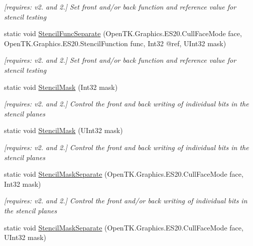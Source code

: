 \begin{DoxyCompactItemize}
\begin{DoxyCompactList}\small\item\em \mbox{[}requires\-: v2. and 2.\mbox{]} Set front and/or back function and reference value for stencil testing \end{DoxyCompactList}\item 
static void \hyperlink{class_open_t_k_1_1_graphics_1_1_e_s20_1_1_g_l_aa697e571e6a7501ef1214d4f4e939ae1}{Stencil\-Func\-Separate} (Open\-T\-K.\-Graphics.\-E\-S20.\-Cull\-Face\-Mode face, Open\-T\-K.\-Graphics.\-E\-S20.\-Stencil\-Function func, Int32 @ref, U\-Int32 mask)
\begin{DoxyCompactList}\small\item\em \mbox{[}requires\-: v2. and 2.\mbox{]} Set front and/or back function and reference value for stencil testing \end{DoxyCompactList}\item 
static void \hyperlink{class_open_t_k_1_1_graphics_1_1_e_s20_1_1_g_l_a33d0ee8613fd2f8cc2da911e2e7d62a7}{Stencil\-Mask} (Int32 mask)
\begin{DoxyCompactList}\small\item\em \mbox{[}requires\-: v2. and 2.\mbox{]} Control the front and back writing of individual bits in the stencil planes \end{DoxyCompactList}\item 
static void \hyperlink{class_open_t_k_1_1_graphics_1_1_e_s20_1_1_g_l_aa1749612e50358cb575103a9b013c9e8}{Stencil\-Mask} (U\-Int32 mask)
\begin{DoxyCompactList}\small\item\em \mbox{[}requires\-: v2. and 2.\mbox{]} Control the front and back writing of individual bits in the stencil planes \end{DoxyCompactList}\item 
static void \hyperlink{class_open_t_k_1_1_graphics_1_1_e_s20_1_1_g_l_a7684e693ec6fb60f4ed55dec606ebcac}{Stencil\-Mask\-Separate} (Open\-T\-K.\-Graphics.\-E\-S20.\-Cull\-Face\-Mode face, Int32 mask)
\begin{DoxyCompactList}\small\item\em \mbox{[}requires\-: v2. and 2.\mbox{]} Control the front and/or back writing of individual bits in the stencil planes \end{DoxyCompactList}\item 
static void \hyperlink{class_open_t_k_1_1_graphics_1_1_e_s20_1_1_g_l_a955f932f5f00b7e14bab65d9198f7cfe}{Stencil\-Mask\-Separate} (Open\-T\-K.\-Graphics.\-E\-S20.\-Cull\-Face\-Mode face, U\-Int32 mask)

\end{DoxyCompactItemize}
